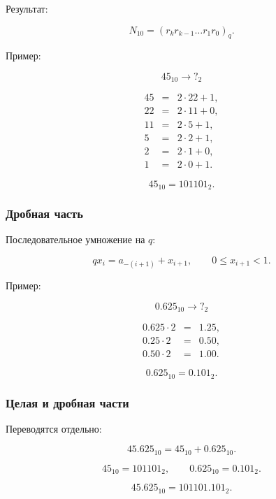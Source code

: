 \documentclass[../final.tex]{subfiles}
\begin{document}
Результат:

\[
N_{10}
=
(r_k r_{k-1}\ldots r_1r_0)_q.
\]


\medskip

Пример:

\[
45_{10}\longrightarrow ?_2
\]

\[
\begin{array}{rcl}
45 &=& 2\cdot22+1,\\
22 &=& 2\cdot11+0,\\
11 &=& 2\cdot5+1,\\
5  &=& 2\cdot2+1,\\
2  &=& 2\cdot1+0,\\
1  &=& 2\cdot0+1.
\end{array}
\]

\[
45_{10}=101101_2.
\]


\subsubsection{Дробная часть}

Последовательное умножение на $q$:

\[
qx_i=a_{-(i+1)}+x_{i+1},
\qquad
0\leq x_{i+1}<1.
\]


\medskip

Пример:

\[
0.625_{10}\longrightarrow ?_2
\]

\[
\begin{array}{rcl}
0.625\cdot2 &=& 1.25,\\
0.25 \cdot2 &=& 0.50,\\
0.50 \cdot2 &=& 1.00.
\end{array}
\]

\[
0.625_{10}=0.101_2.
\]


\subsubsection{Целая и дробная части}

Переводятся отдельно:

\[
45.625_{10}
=
45_{10}+0.625_{10}.
\]

\[
45_{10}=101101_2,
\qquad
0.625_{10}=0.101_2.
\]

\[
45.625_{10}=101101.101_2.
\]


\end{document}
